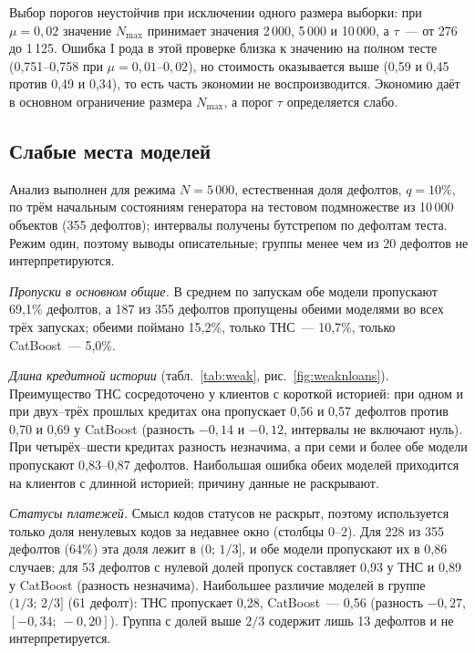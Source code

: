 \documentclass{misisarticle}
\begin{document}
Выбор порогов неустойчив при исключении одного размера выборки: при $\mu=0{,}02$ значение $N_{\max}$ принимает значения 2\,000, 5\,000 и 10\,000, а $\tau$~--- от 276 до 1\,125. Ошибка I рода в этой проверке близка к значению на полном тесте (0,751--0,758 при $\mu=0{,}01$--$0{,}02$), но стоимость оказывается выше (0,59 и 0,45 против 0,49 и 0,34), то есть часть экономии не воспроизводится. Экономию даёт в основном ограничение размера $N_{\max}$, а порог $\tau$ определяется слабо.

\subsection{Слабые места моделей}

Анализ выполнен для режима $N=5\,000$, естественная доля дефолтов, $q=10\%$, по трём начальным состояниям генератора на тестовом подмножестве из 10\,000 объектов (355 дефолтов); интервалы получены бутстрепом по дефолтам теста. Режим один, поэтому выводы описательные; группы менее чем из 20 дефолтов не интерпретируются.

\textit{Пропуски в основном общие.} В среднем по запускам обе модели пропускают 69,1\% дефолтов, а 187 из 355 дефолтов пропущены обеими моделями во всех трёх запусках; обеими поймано 15,2\%, только ТНС~--- 10,7\%, только CatBoost~--- 5,0\%.

\textit{Длина кредитной истории} (табл.~\ref{tab:weak}, рис.~\ref{fig:weaknloans}). Преимущество ТНС сосредоточено у клиентов с короткой историей: при одном и при двух--трёх прошлых кредитах она пропускает 0,56 и 0,57 дефолтов против 0,70 и 0,69 у CatBoost (разность $-0{,}14$ и $-0{,}12$, интервалы не включают нуль). При четырёх--шести кредитах разность незначима, а при семи и более обе модели пропускают 0,83--0,87 дефолтов. Наибольшая ошибка обеих моделей приходится на клиентов с длинной историей; причину данные не раскрывают.

\textit{Статусы платежей.} Смысл кодов статусов не раскрыт, поэтому используется только доля ненулевых кодов за недавнее окно (столбцы 0--2). Для 228 из 355 дефолтов (64\%) эта доля лежит в $(0;\,1/3]$, и обе модели пропускают их в 0,86 случаев; для 53 дефолтов с нулевой долей пропуск составляет 0,93 у ТНС и 0,89 у CatBoost (разность незначима). Наибольшее различие моделей в группе $(1/3;\,2/3]$ (61 дефолт): ТНС пропускает 0,28, CatBoost~--- 0,56 (разность $-0{,}27$, $[-0{,}34;\ -0{,}20]$). Группа с долей выше $2/3$ содержит лишь 13 дефолтов и не интерпретируется.
\end{document}

